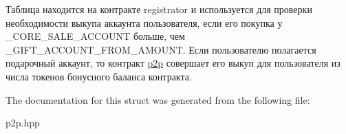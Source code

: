 Таблица находится на контракте registrator и используется для проверки необходимости выкупа аккаунта пользователя, если его покупка у \+\_\+\+C\+O\+R\+E\+\_\+\+S\+A\+L\+E\+\_\+\+A\+C\+C\+O\+U\+NT больше, чем \+\_\+\+G\+I\+F\+T\+\_\+\+A\+C\+C\+O\+U\+N\+T\+\_\+\+F\+R\+O\+M\+\_\+\+A\+M\+O\+U\+NT. Если пользователю полагается подарочный аккаунт, то контракт \mbox{\hyperlink{classp2p}{p2p}} совершает его выкуп для пользователя из числа токенов бонусного баланса контракта. 

The documentation for this struct was generated from the following file\+:\begin{DoxyCompactItemize}
\item 
p2p.\+hpp\end{DoxyCompactItemize}
